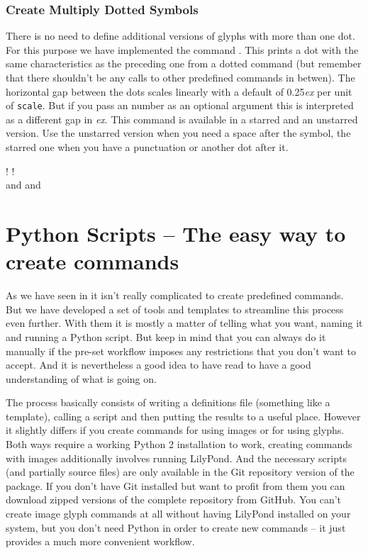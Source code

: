 \documentclass{article}
\begin{document}
\subsubsection{Create Multiply Dotted Symbols}
\label{subsubsec:multiply_dotted_symbols}

There is no need to define additional versions of glyphs with more than one dot.
For this purpose we have implemented the command .
This prints a dot with the same characteristics as the preceding one from a dotted command (but remember that there shouldn't be any calls to other predefined commands in betwen).
The horizontal gap between the dots scales linearly with a default of 0.25\emph{ex} per unit of \texttt{scale}.
But if you pass an number as an optional argument this is interpreted as a different gap in \emph{ex}.
This command is available in a starred and an unstarred version.
Use the unstarred version when you need a space after the symbol, the starred one when you have a punctuation or another dot after it.

\noindent {}! 
\halfNoteRestDotted*\lilyPrintMoreDots*!\\
 and 
\halfNoteRestDotted*[scale=1.5]\lilyPrintMoreDots and 


\section{Python Scripts -- The easy way to create commands}
\label{sec:python_scripts}
As we have seen in  it isn't really complicated to create predefined commands.
But we have developed a set of tools and templates to streamline this process even further.
With them it is mostly a matter of telling what you want, naming it and running a Python script.
But keep in mind that you can always do it manually if the pre-set workflow imposes any restrictions that you don't want to accept.
And it is nevertheless a good idea to have read  to have a good understanding of what is going on.

The process basically consists of writing a definitions file (something like a template), calling a script and then putting the results to a useful place.
However it slightly differs if you create commands for using images or for using \emmentaler glyphs.
Both ways require a working Python 2 installation to work, creating commands with images additionally involves running LilyPond.
And the necessary scripts (and partially source files) are only available in the Git repository version of the package.
If you don't have Git installed but want to profit from them you can download zipped versions of the complete repository from GitHub.
You can't create image glyph commands at all without having LilyPond installed on your system, but you don't need Python in order to create new commands -- it just provides a much more convenient workflow.
\end{document}
